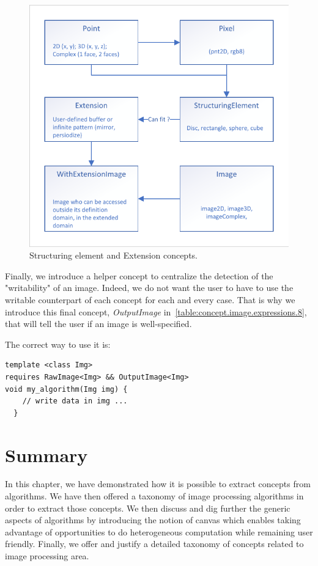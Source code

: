 \begin{figure}[htbp]
  \centering
  \includegraphics[width=.8\linewidth]{figs/concepts/se_extension.pdf}
  \caption{Structuring element and Extension concepts.}
  \label{fig:concept.se_extension}
\end{figure}

Finally, we introduce a helper concept to centralize the detection of the "writability" of an image. Indeed, we do not
want the user to have to use the writable counterpart of each concept for each and every case. That is why we introduce
this final concept, \emph{OutputImage} in~\cref{table:concept.image.expressions.8}, that will tell the user if an image
is well-specified.

The correct way to use it is:
\begin{verbatim}
template <class Img>
requires RawImage<Img> && OutputImage<Img>
void my_algorithm(Img img) {
    // write data in img ...
  }
\end{verbatim}

\section{Summary}

In this chapter, we have demonstrated how it is possible to extract concepts from algorithms. We have then offered a
taxonomy of image processing algorithms in order to extract those concepts. We then discuss and dig further the generic
aspects of algorithms by introducing the notion of canvas which enables taking advantage of opportunities to do
heterogeneous computation while remaining user friendly. Finally, we offer and justify a detailed taxonomy of concepts
related to image processing area.
